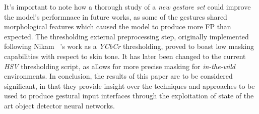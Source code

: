 \documentclass[10pt,twocolumn,letterpaper]{article}
\begin{document}
\begin{flushleft}
It's important to note how a thorough study of a \textit{new gesture set} could improve the model's performnace in future works, as some of the gestures shared morphological features which caused the model to produce more FP than expected.
The thresholding external preprocessing step, originally implemented following Nikam \etal~\cite{7916786}'s work as a \textit{YCbCr} thresholding, proved to boast low masking capabilities with respect to skin tone. It has later been changed to the current \textit{HSV} thresholding script, as allows for more precise masking for \textit{in-the-wild} environments.\linebreak
In conclusion, the results of this paper are to be considered significant, in that they provide insight over the techniques and approaches to be used to produce gestural input interfaces through the exploitation of state of the art object detector neural networks.\linebreak
\end{flushleft}

\pagebreak
{\small


}
\end{document}
